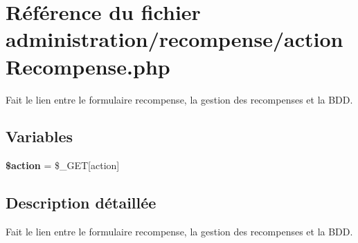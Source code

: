 \hypertarget{actionRecompense_8php}{}\section{Référence du fichier administration/recompense/action\+Recompense.php}
\label{actionRecompense_8php}


Fait le lien entre le formulaire recompense, la gestion des recompenses et la B\+DD.  


\subsection*{Variables}
\begin{DoxyCompactItemize}
\item 
\mbox{\label{actionRecompense_8php_aa698a3e72116e8e778be0e95d908ee30}} 
{\bfseries \$action} = \$\+\_\+\+G\+ET\mbox{[}\textquotesingle{}action\textquotesingle{}\mbox{]}
\end{DoxyCompactItemize}


\subsection{Description détaillée}
Fait le lien entre le formulaire recompense, la gestion des recompenses et la B\+DD. 

